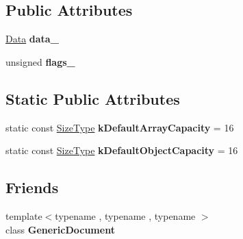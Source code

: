\subsection*{Public Attributes}
\begin{DoxyCompactItemize}
\item 
\hyperlink{union_generic_value_1_1_data}{Data} {\bfseries data\+\_\+}\hypertarget{class_generic_value_aaf80f2c91d26fdde60b9edeeecd3509f}{}\label{class_generic_value_aaf80f2c91d26fdde60b9edeeecd3509f}

\item 
unsigned {\bfseries flags\+\_\+}\hypertarget{class_generic_value_ad0f9ce0bc0d1714678a77a2295da420c}{}\label{class_generic_value_ad0f9ce0bc0d1714678a77a2295da420c}

\end{DoxyCompactItemize}
\subsection*{Static Public Attributes}
\begin{DoxyCompactItemize}
\item 
static const \hyperlink{rapidjson_8h_a5ed6e6e67250fadbd041127e6386dcb5}{Size\+Type} {\bfseries k\+Default\+Array\+Capacity} = 16\hypertarget{class_generic_value_a188f57bdb1923c1fefe74baa995871a3}{}\label{class_generic_value_a188f57bdb1923c1fefe74baa995871a3}

\item 
static const \hyperlink{rapidjson_8h_a5ed6e6e67250fadbd041127e6386dcb5}{Size\+Type} {\bfseries k\+Default\+Object\+Capacity} = 16\hypertarget{class_generic_value_a284d018914629aed9a4bd97fe2dc5899}{}\label{class_generic_value_a284d018914629aed9a4bd97fe2dc5899}

\end{DoxyCompactItemize}
\subsection*{Friends}
\begin{DoxyCompactItemize}
\item 
{\footnotesize template$<$typename , typename , typename $>$ }\\class {\bfseries Generic\+Document}\hypertarget{class_generic_value_ab05bc9e52e201a2867ea5bac141ee1ae}{}\label{class_generic_value_ab05bc9e52e201a2867ea5bac141ee1ae}

\end{DoxyCompactItemize}
